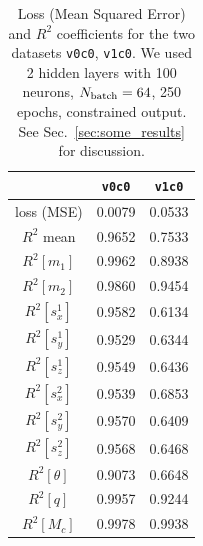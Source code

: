 \documentclass[prd,aps,twocolumn,a4paper,showkeys,nofootinbib]{revtex4-1}
\begin{document}
\begin{table}[t]
\caption{\label{tab:some_results} Loss (Mean Squared Error) and $R^2$ coefficients
 	for the two datasets \texttt{v0c0}, \texttt{v1c0}.
   	We used 2 hidden layers with 100 neurons, $N_{\rm batch}=64$, 250 epochs,  
   	constrained output. See Sec.~\ref{sec:some_results} for discussion.}
\begin{center}
\begin{ruledtabular}
\begin{tabular}{c | c | c} 
 & \texttt{v0c0} & \texttt{v1c0}  \\
\hline
\hline
loss (MSE)      & 0.0079 & 0.0533 \\
\hline
$R^2$ mean      & 0.9652 & 0.7533 \\
\hline
$R^2 [m_1   ]$  & 0.9962 & 0.8938 \\
$R^2 [m_2   ]$  & 0.9860 & 0.9454 \\
$R^2 [s^1_x ]$  & 0.9582 & 0.6134 \\
$R^2 [s^1_y ]$  & 0.9529 & 0.6344 \\
$R^2 [s^1_z ]$  & 0.9549 & 0.6436 \\
$R^2 [s^2_x ]$  & 0.9539 & 0.6853 \\
$R^2 [s^2_y ]$  & 0.9570 & 0.6409 \\
$R^2 [s^2_z ]$  & 0.9568 & 0.6468 \\
$R^2 [\theta]$  & 0.9073 & 0.6648 \\
$R^2 [q     ]$  & 0.9957 & 0.9244 \\
$R^2 [M_c   ]$  & 0.9978 & 0.9938 
\end{tabular}
\end{ruledtabular}
\end{center}
\end{table}

\end{document}
